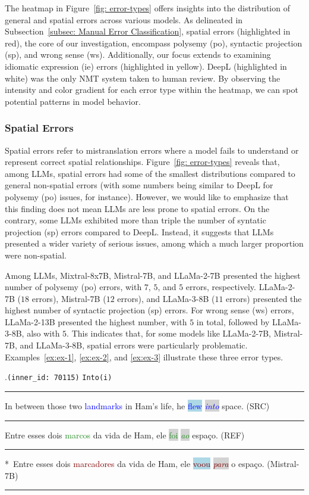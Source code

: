 The heatmap in Figure~\ref{fig: error-types} offers insights into the distribution of general and spatial errors across various models. As delineated in Subsection~\ref{subsec: Manual Error Classification}, spatial errors (highlighted in red), the core of our investigation, encompass polysemy (po), syntactic projection (sp), and wrong sense (ws). Additionally, our focus extends to examining idiomatic expression (ie) errors (highlighted in yellow). DeepL (highlighted in white) was the only NMT system taken to human review. By observing the intensity and color gradient for each error type within the heatmap, we can spot potential patterns in model behavior.


\subsubsection{Spatial Errors}

Spatial errors refer to mistranslation errors where a model fails to understand or represent correct spatial relationships. Figure~\ref{fig: error-types} reveals that, among LLMs, spatial errors had some of the smallest distributions compared to general non-spatial errors (with some numbers being similar to DeepL for polysemy (po) issues, for instance). However, we would like to emphasize that this finding does not mean LLMs are less prone to spatial errors. On the contrary, some LLMs exhibited more than triple the number of syntatic projection (sp) errors compared to DeepL. Instead, it suggests that LLMs presented a wider variety of serious issues, among which a much larger proportion were non-spatial.

Among LLMs, Mixtral-8x7B, Mistral-7B, and LLaMa-2-7B presented the highest number of polysemy (po) errors, with $7$, $5$, and $5$ errors, respectively. LLaMa-2-7B ($18$ errors), Mistral-7B ($12$ errors), and LLaMa-3-8B ($11$ errors) presented the highest number of syntactic projection (sp) errors. For wrong sense (ws) errors, LLaMa-2-13B presented the highest number, with $5$ in total, followed by LLaMa-3-8B, also with $5$. This indicates that, for some models like LLaMa-2-7B, Mistral-7B, and LLaMa-3-8B, spatial errors were particularly problematic. Examples~\ref{ex:ex-1}, \ref{ex:ex-2}, and \ref{ex:ex-3} illustrate these three error types.

\ex.\texttt{(inner\_id: 70115)} \hfill \texttt{Into(i)} \\[0.3ex] 
\noindent\rule{\linewidth}{0.9pt}
In between those two \textcolor{blue}{landmarks} in Ham's life, he \colorbox{lightblue}{\textcolor{blue}{flew}} \colorbox{lightgray}{\emph{\textcolor{blue}{into}}} space. (SRC) \label{ex:ex-1} \\[-0.3ex] 
\noindent\rule{\linewidth}{0.3pt}
Entre esses dois \textcolor{ForestGreen}{marcos} da vida de Ham, ele \colorbox{lightgray}{\textcolor{ForestGreen}{foi}} \colorbox{lightgray}{\textcolor{ForestGreen}{\emph{ao}}} espaço. (REF) \\[-0.3ex]
\noindent\rule{\linewidth}{0.3pt}
*~Entre esses dois \textcolor{Maroon}{marcadores} da vida de Ham, ele \colorbox{lightblue}{\textcolor{Maroon}{voou}} \colorbox{lightgray}{\textcolor{Maroon}{\emph{para}}} o espaço. (Mistral-7B) \\[-0.3ex] 
\noindent\rule{\linewidth}{0.9pt}

